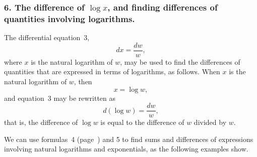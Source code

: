 \documentclass[twoside,openright]{article}
\begin{document}
\subsubsection*{6. The difference of $\log x$, and finding differences of quantities involving logarithms.}

The differential equation~3,
$$dx = \frac{dw}{w},\label{deq}$$
where $x$ is the natural logarithm of $w$, may be used to find the
differences of quantities that are expressed in terms of logarithms,
as follows.  When $x$ is the natural logarithm of $w$, then
$$x = \log w,$$
and equation~3 may be rewritten as
\begin{equation}
d(\log w) = \frac{dw}{w} \label{dlog},
\end{equation}
that is, the difference of $\log w$ is equal to the difference of $w$ divided by $w$.

We can use formulas~4 (page~\pageref{dex}) and 5 to find sums and
differences of expressions involving natural logarithms and
exponentials, as the following examples show.
\end{document}
